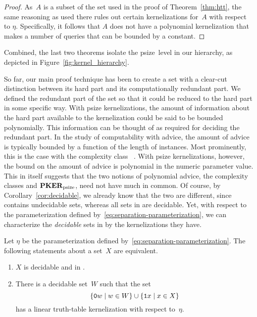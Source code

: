 \begin{proof}
  As~$A$ is a subset of the set used in the proof of Theorem~\ref{thm:htt}, the same reasoning as used there rules out certain kernelizations for~$A$ with respect to $\eta$.
  Specifically, it follows that $A$ does not have a polynomial kernelization that makes a  number of queries that can be bounded by a constant.
\end{proof}

Combined, the last two theorems isolate the psize~level in our hierarchy, as depicted in Figure~\ref{fig:kernel_hierarchy}.

So far, our main proof technique has been to create a set with a clear-cut distinction between its hard part and its computationally redundant part.
We defined the redundant part of the set so that it could be reduced to the hard part in some specific way.
With psize kernelizations, the amount of information about the hard part available to the kernelization could be said to be bounded polynomially.
This information can be thought of as  required for deciding the redundant part.
In the study of computability with advice, the amount of advice is typically bounded by a function of the length of instances.
Most prominently, this is the case with the complexity class ~\parencite{arora2009computational}.
With psize kernelizations, however, the bound on the amount of advice is polynomial in the numeric parameter value.
This in itself suggests that the two notions of polynomial advice, the complexity classes  and $\textnormal{\textbf{PKER}}_\textnormal{psize}$, need not have much in common.
Of course, by Corollary~\ref{cor:decidable}, we already know that the two are different, since  contains undecidable sets, whereas all sets in  are decidable.
Yet, with respect to the parameterization defined by~\eqref{eq:separation-parameterization}, we can characterize the \emph{decidable} sets in  by the kernelizations they have.
\begin{theorem}
\label{thm:ppoly-tt}%
  Let $\eta$ be the parameterization defined by~\eqref{eq:separation-parameterization}.
  The following statements about a set~$X$ are equivalent.
  \begin{enumerate}
  \item\label{enum:advice:ppoly}
    $X$ is decidable and in .
  \item\label{enum:advice:psize}
    There is a decidable set~$W$ such that the set
    \begin{equation*}
      \{\textnormal{\texttt{0}}w \;|\; w \in W\} \cup \{\textnormal{\texttt{1}}x \;|\; x \in X\}
    \end{equation*}
    has a linear truth-table kernelization with respect to~$\eta$.
  \end{enumerate}
\end{theorem}
